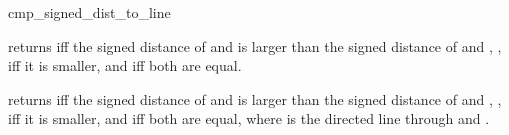\begin{ccRefFunction}{cmp_signed_dist_to_line}

          {returns 
           iff the signed distance of  and 
            is larger than the signed distance of 
           and , , iff it is smaller,
           and  iff both are equal.}

	{returns 
	iff the signed distance of  and 
	 is larger than the signed distance of 
	and , , iff it is smaller,
	and  iff both are equal, where 
         is the directed line through  and .}
\end{ccRefFunction}

